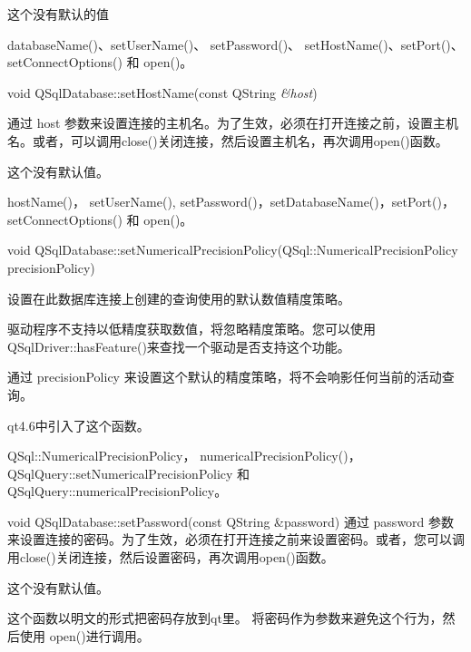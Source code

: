 这个没有默认的值

\begin{seeAlso}
databaseName()、setUserName()、 setPassword()、 setHostName()、setPort()、setConnectOptions() 和 open()。
\end{seeAlso}


void QSqlDatabase::setHostName(const QString \emph{\&host})

通过 host 参数来设置连接的主机名。为了生效，必须在打开连接之前，设置主机名。或者，可以调用close()关闭连接，然后设置主机名，再次调用open()函数。

这个没有默认值。




\begin{seeAlso}
hostName()， setUserName(), setPassword()，setDatabaseName()，setPort()， setConnectOptions() 和 open()。
\end{seeAlso}


void QSqlDatabase::setNumericalPrecisionPolicy(QSql::NumericalPrecisionPolicy precisionPolicy)


设置在此数据库连接上创建的查询使用的默认数值精度策略。

\begin{notice}
驱动程序不支持以低精度获取数值，将忽略精度策略。您可以使用 QSqlDriver::hasFeature()来查找一个驱动是否支持这个功能。
\end{notice}

\begin{notice}
通过 precisionPolicy 来设置这个默认的精度策略，将不会响影任何当前的活动查询。
\end{notice}

qt4.6中引入了这个函数。


\begin{seeAlso}
QSql::NumericalPrecisionPolicy，
numericalPrecisionPolicy()，QSqlQuery::setNumericalPrecisionPolicy 和 QSqlQuery::numericalPrecisionPolicy。
\end{seeAlso}



void QSqlDatabase::setPassword(const QString \&password)
通过 password 参数来设置连接的密码。为了生效，必须在打开连接之前来设置密码。或者，您可以调用close()关闭连接，然后设置密码，再次调用open()函数。

这个没有默认值。

\begin{notice}[警告]
这个函数以明文的形式把密码存放到qt里。 将密码作为参数来避免这个行为，然后使用 open()进行调用。
\end{notice}

